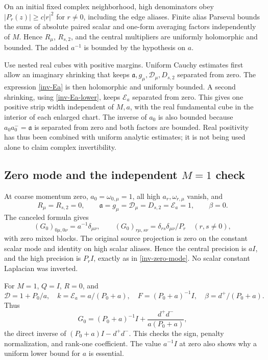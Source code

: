 \documentclass[11pt]{article}
\theoremstyle{remark}
\begin{document}
On an initial fixed complex neighborhood, high denominators obey
$|P_r(z)|\ge c|r|^2$ for $r\ne0$, including the edge aliases.
Finite alias Parseval bounds the sums of absolute paired scalar and
one-form averaging factors independently of $M$. Hence $R_\mu$,
$R_{s,2}$, and the central multipliers are uniformly holomorphic and
bounded. The added $a^{-1}$ is bounded by the hypothesis on $a$.

Use nested real cubes with positive margins. Uniform Cauchy estimates
first allow an imaginary shrinking that keeps $\mathfrak a,g_\mu,
\mathcal D_\mu,D_{s,2}$ separated from zero. The expression
\eqref{inv-Ea} is then holomorphic and uniformly bounded. A second
shrinking, using \eqref{inv-Ea-lower}, keeps $\mathcal E_a$ separated
from zero. This gives one positive strip width independent of $M,a$,
with the real fundamental cube in the interior of each enlarged chart.
The inverse of $a_0$ is also bounded because $a_0a_0^-=\mathfrak a$
is separated from zero and both factors are bounded. Real positivity
has thus been combined with uniform analytic estimates; it is not
being used alone to claim complex invertibility.

\subsection{Zero mode and the independent $M=1$ check}

At coarse momentum zero, $a_0=\omega_{0,\mu}=1$, all high
$a_r,\omega_{r,\mu}$ vanish, and
\[
 R_\mu=R_{s,2}=0,\qquad
 \mathfrak a=g_\mu=\mathcal D_\mu=D_{s,2}=\mathcal E_a=1,
 \qquad\beta=0.
\]
The canceled formula gives
\begin{equation}\label{inv-zero-mode}
 (G_0)_{0\mu,0\nu}=a^{-1}\delta_{\mu\nu},\qquad
 (G_0)_{r\mu,s\nu}=\delta_{rs}\delta_{\mu\nu}/P_r
       \quad(r,s\ne0),
\end{equation}
with zero mixed blocks. The original source projection is zero on the
constant scalar mode and identity on high scalar aliases. Hence the
central precision is $aI$, and the high precision is $P_rI$, exactly
as in \eqref{inv-zero-mode}. No scalar constant Laplacian was inverted.

For $M=1$, $Q=I$, $R=0$, and
\[
 \mathcal D=1+P_0/a,\quad k=\mathcal E_a=a/(P_0+a),\quad
 F=(P_0+a)^{-1}I,\quad\beta=d^+/(P_0+a).
\]
Thus
\begin{equation}\label{inv-M1}
 G_0=(P_0+a)^{-1}I+\frac{d^+d^-}{a(P_0+a)},
\end{equation}
the direct inverse of $(P_0+a)I-d^+d^-$. This checks the sign,
penalty normalization, and rank-one coefficient. The value $a^{-1}I$
at zero also shows why a uniform lower bound for $a$ is essential.
\end{document}
